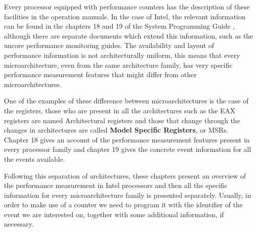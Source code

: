 Every processor equipped with performance counters has the description of these facilities in the operation manuals. In the case of Intel, the relevant information can be found in the chapters 18 and 19 of the System Programming Guide \cite{intel-devguide}, although there are separate documents which extend this information, such as the uncore performance monitoring guides. The availability and layout of performance information is not architecturally uniform, this means that every microarchitecture, even from the same architecture family, has very specific performance measurement features that might differ from other microarchitectures.

One of the examples of these difference between microarchitectures is the case of the registers, those who are present in all the architectures such as the EAX registers are named Architectural registers and those that change through the changes in architectures are called \textbf{Model Specific Registers}, or MSRs. Chapter 18 gives an account of the performance measurement features present in every processor family and chapter 19 gives the concrete event information for all the events available.

Following this separation of architectures, these chapters present an overview of the performance measurement in Intel processors and then all the specific information for every microarchitecture family is presented separately. Usually, in order to make use of a counter we need to program it with the identifier of the event we are interested on, together with some additional information, if necessary.

